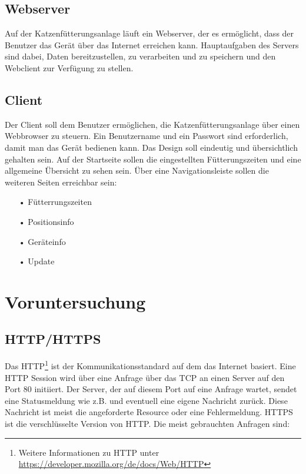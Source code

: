 \subsection{Webserver}
\label{sec:anf-server}
Auf der Katzenfütterungsanlage läuft ein Webserver, der es ermöglicht, dass der Benutzer das Gerät über das Internet erreichen kann. Hauptaufgaben des Servers sind dabei, Daten bereitzustellen, zu verarbeiten und zu speichern und den Webclient zur Verfügung zu stellen.

\subsection{Client}
\label{sec:anf-client}
Der Client soll dem Benutzer ermöglichen, die Katzenfütterungsanlage über einen Webbrowser zu steuern. Ein Benutzername und ein Passwort sind erforderlich, damit man das Gerät bedienen kann. Das Design soll eindeutig und übersichtlich gehalten sein. Auf der Startseite sollen die eingestellten Fütterungszeiten und eine allgemeine Übersicht zu sehen sein. Über eine Navigationsleiste sollen die weiteren Seiten erreichbar sein:

\begin{itemize}
\item[•]Fütterrungszeiten
\item[•]Positionsinfo
\item[•]Geräteinfo
\item[•]Update
\end{itemize}

\section{Voruntersuchung}
\label{sec:voruntersuchung}

\subsection{HTTP/HTTPS}
\label{sec:vor-http}
Das \ac{HTTP}\footnote{Weitere Informationen zu \ac{HTTP} unter \url{https://developer.mozilla.org/de/docs/Web/HTTP}} ist der Kommunikationsstandard auf dem das Internet basiert. Eine HTTP Session wird über eine Anfrage über das \ac{TCP} an einen Server auf den Port 80 initiiert. Der Server, der auf diesem Port auf eine Anfrage wartet, sendet eine Statusmeldung wie z.B.  und eventuell eine eigene Nachricht zurück. Diese Nachricht ist meist die angeforderte Resource oder eine Fehlermeldung. \ac{HTTPS} ist die verschlüsselte Version von \ac{HTTP}. Die meist gebrauchten Anfragen sind:

